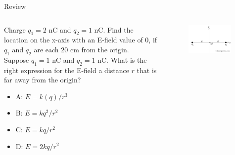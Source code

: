 \documentclass{beamer}
\begin{document}
\begin{frame}{Review}
\begin{columns}[T]
\begin{column}{0.5\textwidth}
\small
Charge $q_1 = 2$ nC and $q_2 = 1$ nC.  Find the location on the x-axis with an E-field value of 0, if $q_1$ and $q_2$ are each 20 cm from the origin. \\ \vspace{0.5cm}
Suppose $q_1 = 1$ nC and $q_2 = 1$ nC.  What is the right expression for the E-field a distance $r$ that is far away from the origin?
\begin{itemize}
\item A: $E = k (q)/r^3$
\item B: $E = kq^2/r^2$
\item C: $E = k q/r^2$
\item D: $E = 2k q/r^2$
\end{itemize}
\end{column}
\begin{column}{0.5\textwidth}
\begin{figure}
\centering
\includegraphics[width=0.95\textwidth]{ex1.png}
\caption{\label{fig:ex1}}
\end{figure}
\end{column}
\end{columns}
\end{frame}
\end{document}
